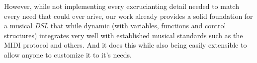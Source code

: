 \documentclass[a4paper,UKenglish,cleveref, autoref]{oasics-v2019}
\begin{document}
However, while not implementing every excrucianting detail needed to match every need that could ever arive, our work already provides a solid foundation for a musical \textit{DSL} that while dynamic (with variables, functions and control structures) integrates very well with established musical standards such as the MIDI protocol and others. And it does this while also being easily extensible to allow anyone to customize it to it's needs.



\end{document}
